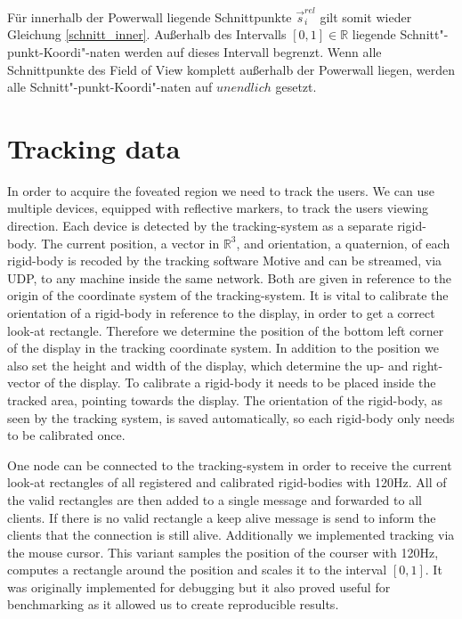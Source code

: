 \documentclass[]{article}
\newcommand{\POW}{Powerwall}
\newcommand{\FOV}{Field of View}
\begin{document}
Für innerhalb der \POW{} liegende Schnittpunkte $\overrightarrow{s}_{i}^{rel}$ gilt somit wieder Gleichung \ref{schnitt_inner}.
Außerhalb des Intervalls $[0,1] \in \mathbb{R}$ liegende Schnitt"-punkt-Koordi"-naten werden auf dieses Intervall begrenzt.
Wenn alle Schnittpunkte des \FOV{} komplett außerhalb der \POW{} liegen, werden alle Schnitt"-punkt-Koordi"-naten auf $unendlich$ gesetzt. 



\newpage

\section{Tracking data}

In order to acquire the foveated region 
we need to track the users.
We can use multiple devices, equipped with reflective markers, to track the users viewing direction.
Each device is detected by the tracking-system as a separate rigid-body.
The current position, a vector in $\mathbb{R}^{3}$, and orientation, a quaternion, of each rigid-body is recoded by the tracking software Motive and can be streamed, via UDP, to any machine inside the same network.
Both are given in reference to the origin of the coordinate system of the tracking-system.
It is vital to calibrate the orientation of a rigid-body in reference to the display, in order to get a correct look-at rectangle.
Therefore we determine the position of the bottom left corner of the display in the tracking coordinate system.
In addition to the position we also set the height and width of the display, which determine the up- and right-vector of the display.
To calibrate a rigid-body it needs to be placed inside the tracked area, pointing towards the display.
The orientation of the rigid-body, as seen by the tracking system, is saved automatically, so each rigid-body only needs to be calibrated once.

One node can be connected to the tracking-system in order to receive the current look-at rectangles of all registered and calibrated rigid-bodies with 120Hz.
All of the valid rectangles are then added to a single message and forwarded to all clients.
If there is no valid rectangle a keep alive message is send to inform the clients that the connection is still alive.
Additionally we implemented tracking via the mouse cursor.
This variant samples the position of the courser with 120Hz, computes a rectangle around the position and scales it to the interval $[0,1]$.
It was originally implemented for debugging but it also proved useful for benchmarking as it allowed us to create reproducible results.
\end{document}
